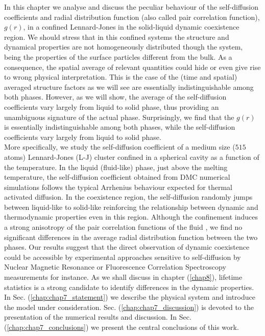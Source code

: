 In this chapter we analyse and discuss the peculiar behaviour of the self-diffusion coefficients and radial distribution function (also called pair correlation function), $g\left (r\right )$, in a confined Lennard-Jones in the solid-liquid dynamic coexistence region. We should stress that in this confined systems the structure and dynamical properties are not homogeneously distributed though the system, being the properties of the surface particles different from the bulk. As a consequence, the spatial average of relevant quantities  could hide or even give rise to wrong physical interpretation. This is the case of the (time and spatial) averaged structure factors as we will see are essentially indistinguishable among both phases. However, as we will show, the average of the self-diffusion coefficients vary largely from liquid to solid phase, thus providing an unambiguous signature of the actual phase.
Surprisingly, we find that the $g\left (r\right )$ is essentially indistinguishable among both phases, while the self-diffusion coefficients vary largely from liquid to solid phase.\\
More specifically, we study the self-diffusion coefficient of a medium size ($515$ atoms) Lennard-Jones (L-J) cluster confined in a spherical cavity as a function of the temperature. In the liquid (fluid-like) phase, just above the melting temperature, the self-diffusion coefficient obtained from DMC numerical simulations follows the typical Arrhenius behaviour expected for thermal activated diffusion. 
In the coexistence region, the self-diffusion randomly jumps between liquid-like to solid-like reinforcing the relationship between dynamic and thermodynamic properties even in this region. Although the confinement induces a strong anisotropy of the pair correlation functions of the fluid \cite{Nygard2012}, we find no significant differences in the average radial distribution function between the two phases. Our results suggest that the direct observation of dynamic coexistence could be accessible by experimental approaches sensitive to self-diffusion by Nuclear Magnetic Resonance \cite{kimmich1997nmr} or Fluorescence Correlation Spectroscopy \cite{magde1974fluorescence} measurements for instance. As we shall discuss in chapter (\ref{chap8}), lifetime statistics is a strong candidate to identify differences in the dynamic properties.\\
In Sec. (\ref{chap:chap7_statement}) we describe the physical system and introduce the model under consideration. Sec. (\ref{chap:chap7_discussion}) is devoted to the presentation of the numerical results and discussion. In Sec. (\ref{chap:chap7_conclusions}) we present the central conclusions of this work.

